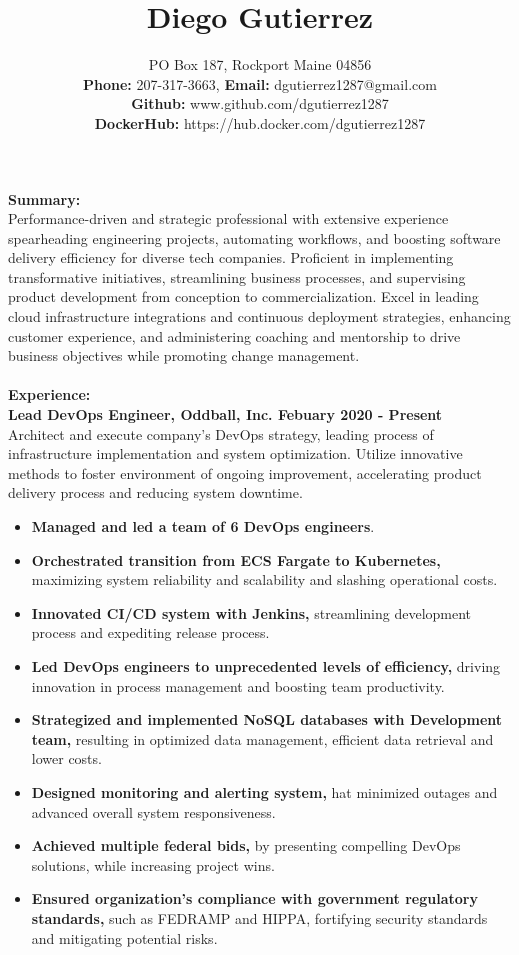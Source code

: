 \documentclass[10pt]{article}
\title{Diego Gutierrez}
\date{}
\author{%
	PO Box 187, Rockport Maine 04856\\
	\textbf{Phone:} 207-317-3663, \textbf{Email:} dgutierrez1287@gmail.com\\
	\textbf{Github:} www.github.com/dgutierrez1287\\
	\textbf{DockerHub:} https://hub.docker.com/dgutierrez1287
}
\makeatletter
\renewcommand{\maketitle}{\bgroup\setlength{\parindent}{0pt}
	\begin{flushleft}
		\LARGE\textbf{\@title}
		
		\normalsize\@author
	\end{flushleft}\egroup
}
\makeatother
\begin{document}
\maketitle
\thispagestyle{empty} %
\noindent\Large\textbf{Summary:}\\
\normalsize Performance-driven and strategic professional with extensive experience spearheading engineering projects, 
automating workflows, and boosting software delivery efficiency for diverse tech companies. Proficient in implementing transformative initiatives, 
streamlining business processes, and supervising product development from conception to commercialization. Excel in leading cloud infrastructure 
integrations and continuous deployment strategies, enhancing customer experience, and administering coaching and mentorship to drive business 
objectives while promoting change management.
\\
\\
\noindent\Large\textbf{Experience:}\\
\normalsize
\textbf{Lead DevOps Engineer, Oddball, Inc. \hfill{Febuary 2020 - Present}}\\
\normalsize Architect and execute company's DevOps strategy, leading process of infrastructure implementation and system optimization. 
Utilize innovative methods to foster environment of ongoing improvement, accelerating product delivery process and reducing system downtime.
\begin{itemize}
\small
\item \textbf{Managed and led a team of 6 DevOps engineers}.
\item \textbf{Orchestrated transition from ECS Fargate to Kubernetes,} maximizing system reliability and scalability and slashing operational costs.
\item \textbf{Innovated CI/CD system with Jenkins,} streamlining development process and expediting release process.
\item \textbf{Led DevOps engineers to unprecedented levels of efficiency,} driving innovation in process management and boosting
team productivity. 
\item \textbf{Strategized and implemented NoSQL databases with Development team,} resulting in optimized data management,
efficient data retrieval and lower costs.
\item \textbf{Designed monitoring and alerting system,} hat minimized outages and advanced overall system responsiveness.
\item \textbf{Achieved multiple federal bids,} by presenting compelling DevOps solutions, while increasing project wins.
\item \textbf{Ensured organization's compliance with government regulatory standards,} such as FEDRAMP and HIPPA, fortifying
security standards and mitigating potential risks.
\end{itemize}
\end{document}
